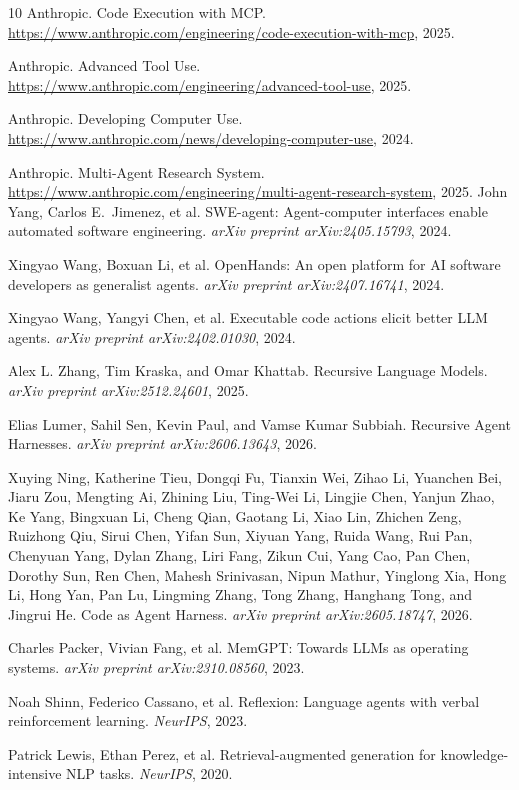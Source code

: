 \documentclass[11pt, logo, onecolumn, copyright, colorlinks=true, allcolors=blue]{nvidiatechreport}
\begin{document}
\begin{thebibliography}{10}
Anthropic.
\newblock Code Execution with MCP.
\newblock \url{https://www.anthropic.com/engineering/code-execution-with-mcp}, 2025.

Anthropic.
\newblock Advanced Tool Use.
\newblock \url{https://www.anthropic.com/engineering/advanced-tool-use}, 2025.

Anthropic.
\newblock Developing Computer Use.
\newblock \url{https://www.anthropic.com/news/developing-computer-use}, 2024.

Anthropic.
\newblock Multi-Agent Research System.
\newblock \url{https://www.anthropic.com/engineering/multi-agent-research-system}, 2025.
John Yang, Carlos E.~Jimenez, et al.
\newblock SWE-agent: Agent-computer interfaces enable automated software engineering.
\newblock \emph{arXiv preprint arXiv:2405.15793}, 2024.

Xingyao Wang, Boxuan Li, et al.
\newblock OpenHands: An open platform for AI software developers as generalist agents.
\newblock \emph{arXiv preprint arXiv:2407.16741}, 2024.

Xingyao Wang, Yangyi Chen, et al.
\newblock Executable code actions elicit better LLM agents.
\newblock \emph{arXiv preprint arXiv:2402.01030}, 2024.


Alex L. Zhang, Tim Kraska, and Omar Khattab.
\newblock Recursive Language Models.
\newblock \emph{arXiv preprint arXiv:2512.24601}, 2025.

Elias Lumer, Sahil Sen, Kevin Paul, and Vamse Kumar Subbiah.
\newblock Recursive Agent Harnesses.
\newblock \emph{arXiv preprint arXiv:2606.13643}, 2026.

Xuying Ning, Katherine Tieu, Dongqi Fu, Tianxin Wei, Zihao Li, Yuanchen Bei,
Jiaru Zou, Mengting Ai, Zhining Liu, Ting-Wei Li, Lingjie Chen, Yanjun Zhao,
Ke Yang, Bingxuan Li, Cheng Qian, Gaotang Li, Xiao Lin, Zhichen Zeng,
Ruizhong Qiu, Sirui Chen, Yifan Sun, Xiyuan Yang, Ruida Wang, Rui Pan,
Chenyuan Yang, Dylan Zhang, Liri Fang, Zikun Cui, Yang Cao, Pan Chen,
Dorothy Sun, Ren Chen, Mahesh Srinivasan, Nipun Mathur, Yinglong Xia,
Hong Li, Hong Yan, Pan Lu, Lingming Zhang, Tong Zhang, Hanghang Tong, and
Jingrui He.
\newblock Code as Agent Harness.
\newblock \emph{arXiv preprint arXiv:2605.18747}, 2026.

Charles Packer, Vivian Fang, et al.
\newblock MemGPT: Towards LLMs as operating systems.
\newblock \emph{arXiv preprint arXiv:2310.08560}, 2023.

Noah Shinn, Federico Cassano, et al.
\newblock Reflexion: Language agents with verbal reinforcement learning.
\newblock \emph{NeurIPS}, 2023.

Patrick Lewis, Ethan Perez, et al.
\newblock Retrieval-augmented generation for knowledge-intensive NLP tasks.
\newblock \emph{NeurIPS}, 2020.

\end{thebibliography}
\end{document}
